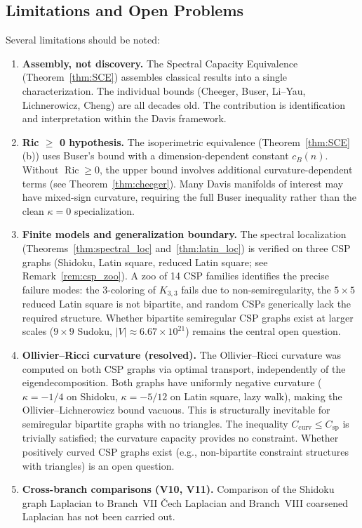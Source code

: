 \documentclass[11pt]{article}
\theoremstyle{definition}
\theoremstyle{remark}
\newcommand{\Ric}{\operatorname{Ric}}
\newcommand{\Csp}{C_{\mathrm{sp}}}
\begin{document}
\subsection{Limitations and Open Problems}

Several limitations should be noted:
\begin{enumerate}[nosep]
\item \textbf{Assembly, not discovery.} The Spectral Capacity Equivalence (Theorem~\ref{thm:SCE}) assembles classical results into a single characterization. The individual bounds (Cheeger, Buser, Li--Yau, Lichnerowicz, Cheng) are all decades old. The contribution is identification and interpretation within the Davis framework.
\item \textbf{Ric $\ge$ 0 hypothesis.} The isoperimetric equivalence (Theorem~\ref{thm:SCE}(b)) uses Buser's bound with a dimension-dependent constant $c_B(n)$. Without $\Ric \ge 0$, the upper bound involves additional curvature-dependent terms (see Theorem~\ref{thm:cheeger}). Many Davis manifolds of interest may have mixed-sign curvature, requiring the full Buser inequality rather than the clean $\kappa = 0$ specialization.
\item \textbf{Finite models and generalization boundary.} The spectral localization (Theorems~\ref{thm:spectral_loc} and~\ref{thm:latin_loc}) is verified on three CSP graphs (Shidoku, Latin square, reduced Latin square; see Remark~\ref{rem:csp_zoo}).  A zoo of 14 CSP families identifies the precise failure modes: the 3-coloring of $K_{3,3}$ fails due to non-semiregularity, the $5 \times 5$ reduced Latin square is not bipartite, and random CSPs generically lack the required structure.  Whether bipartite semiregular CSP graphs exist at larger scales ($9 \times 9$ Sudoku, $|V| \approx 6.67 \times 10^{21}$) remains the central open question.
\item \textbf{Ollivier--Ricci curvature (resolved).} The Ollivier--Ricci curvature was computed on both CSP graphs via optimal transport, independently of the eigendecomposition.  Both graphs have uniformly negative curvature ($\kappa = -1/4$ on Shidoku, $\kappa = -5/12$ on Latin square, lazy walk), making the Ollivier--Lichnerowicz bound vacuous.  This is structurally inevitable for semiregular bipartite graphs with no triangles.  The inequality $C_{\mathrm{curv}} \le \Csp$ is trivially satisfied; the curvature capacity provides no constraint.  Whether positively curved CSP graphs exist (e.g., non-bipartite constraint structures with triangles) is an open question.
\item \textbf{Cross-branch comparisons (V10, V11).} Comparison of the Shidoku graph Laplacian to Branch~VII \v{C}ech Laplacian and Branch~VIII coarsened Laplacian has not been carried out.

\end{enumerate}
\end{document}
